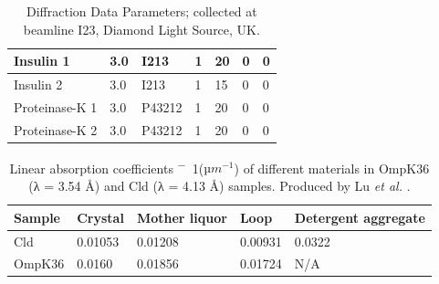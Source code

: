\begin{table}[]
\begin{tabular}{@{}lllllll@{}}
Insulin 1                       & 3.0                                                                            & I213                                                                      & 1                                                            & 20                                                          & 0        & 0      \\ \midrule
Insulin 2                       & 3.0                                                                            & I213                                                                      & 1                                                            & 15                                                          & 0        & 0      \\ \midrule
Proteinase-K 1                  & 3.0                                                                            & P43212                                                                    & 1                                                            & 20                                                          & 0        & 0      \\
Proteinase-K 2                  & 3.0                                                                            & P43212                                                                    & 1                                                            & 20                                                          & 0        & 0      \\ \bottomrule
\end{tabular}
\caption{Diffraction Data Parameters; collected at beamline I23, Diamond Light Source, UK.}
\label{diffration_table}
\end{table}





\begin{table}[]
\begin{tabular}{@{}lllll@{}}
\toprule
Sample & Crystal & Mother liquor & Loop    & Detergent aggregate \\ \midrule
Cld    & 0.01053 & 0.01208       & 0.00931 & 0.0322              \\
OmpK36 & 0.0160  & 0.01856       & 0.01724 & N/A                 \\ \bottomrule
\end{tabular}
\caption{Linear absorption coefficients \unit{\mu^-1}($µm^{−1}$) of different materials in OmpK36 (λ = 3.54 Å) and Cld (λ = 4.13 Å) samples. Produced by Lu \textit{et al.} \cite{Lu2024}.}
\label{Cld_Ompk_ACs}
\end{table}





